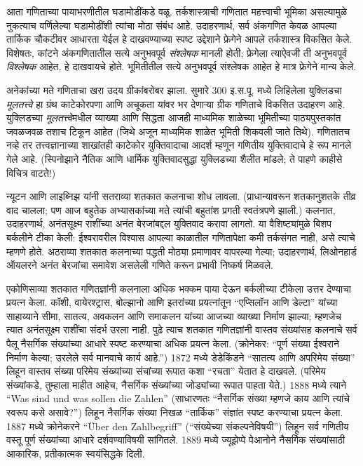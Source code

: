 \documentclass[../../../include/open-logic-section]{subfiles}
\begin{document}
आता गणिताच्या पायाभरणीतील घडामोडींकडे वळू. तर्कशास्त्राची गणितात महत्त्वाची
भूमिका असल्यामुळे नुकत्याच वर्णिलेल्या घडामोडींशी त्यांचा मोठा संबंध आहे.
उदाहरणार्थ, सर्व अंकगणित केवळ आपल्या तार्किक चौकटीवर आधारता येईल हे
दाखवण्याच्या स्पष्ट उद्देशाने फ्रेगेने आपले तर्कशास्त्र विकसित केले.
विशेषतः, कांटने अंकगणितातील सत्ये अनुभवपूर्व \emph{संश्लेषक} मानली होती;
फ्रेगेला त्याऐवजी ती अनुभवपूर्व \emph{विश्लेषक} आहेत, हे दाखवायचे होते.
भूमितीतील सत्ये अनुभवपूर्व संश्लेषक आहेत हे मात्र फ्रेगेने मान्य केले.

अनेकांच्या मते गणिताचा खरा उदय ग्रीकांबरोबर झाला. सुमारे 300 इ.स.पू.
मध्ये लिहिलेला युक्लिडचा \emph{मूलतत्त्वे} हा ग्रंथ काटेकोरपणा आणि
अचूकता यांवर भर देणाऱ्या ग्रीक गणिताचे विकसित उदाहरण आहे. युक्लिडच्या
\emph{मूलतत्त्वे}मधील व्याख्या आणि सिद्धता आजही माध्यमिक शाळेच्या
भूमितीच्या पाठ्यपुस्तकांत जवळजवळ तशाच टिकून आहेत (जिथे अजून माध्यमिक
शाळेत भूमिती शिकवली जाते तिथे). गणितातच नव्हे तर तत्त्वज्ञानाच्या
शाखांतही काटेकोर युक्तिवादाचा आदर्श म्हणून गणितीय युक्तिवादाचे हे रूप
मानले गेले आहे. (स्पिनोझाने नैतिक आणि धार्मिक युक्तिवादसुद्धा
युक्लिडच्या शैलीत मांडले; ते पाहणे काहीसे विचित्र वाटते!)

न्यूटन आणि लाइब्निझ यांनी सतराव्या शतकात कलनाचा शोध लावला. (प्राधान्यावरून
शतकानुशतके तीव्र वाद चालला; पण आज बहुतेक अभ्यासकांच्या मते त्यांची
बहुतांश प्रगती स्वतंत्रपणे झाली.) कलनात, उदाहरणार्थ, अनंतसूक्ष्म
राशींच्या अनंत बेरजांबद्दल युक्तिवाद करावा लागतो. या वैशिष्ट्यांमुळे
बिशप बर्कलीने टीका केली: ईश्वरावरील विश्वास आपल्या काळातील गणितापेक्षा
कमी तर्कसंगत नाही, असे त्याचे म्हणणे होते. अठराव्या शतकात कलनाच्या
पद्धती मोठ्या प्रमाणावर वापरल्या गेल्या; उदाहरणार्थ, लिओनहार्ड
ऑयलरने अनंत बेरजांचा समावेश असलेली गणिते करून प्रभावी निष्कर्ष मिळवले.

एकोणिसाव्या शतकात गणितज्ञांनी कलनाला अधिक भक्कम पाया देऊन बर्कलीच्या
टीकेला उत्तर देण्याचा प्रयत्न केला. कॉशी, वायेरश्ट्रास, बोल्झानो आणि
इतरांच्या प्रयत्नांतून ``एप्सिलॉन आणि डेल्टा'' यांच्या साहाय्याने सीमा,
सातत्य, अवकलन आणि समाकलन यांच्या आजच्या व्याख्या निर्माण झाल्या; म्हणजेच
त्यात अनंतसूक्ष्म राशींचा संदर्भ उरला नाही. पुढे त्याच शतकात गणितज्ञांनी
वास्तव संख्यांसह कलनाचे सर्व पैलू नैसर्गिक संख्यांच्या आधारे स्पष्ट
करण्याचा अधिक प्रयत्न केला. (क्रोनेकर: ``पूर्ण संख्या ईश्वराने निर्माण
केल्या; उरलेले सर्व मानवाचे कार्य आहे.'') 1872 मध्ये डेडेकिंडने
``सातत्य आणि अपरिमेय संख्या'' लिहून वास्तव संख्या परिमेय संख्यांच्या
संचांच्या रूपात कशा ``रचता'' येतात हे दाखवले. (परिमेय संख्यांकडे, तुम्हाला
माहीत आहेच, नैसर्गिक संख्यांच्या जोड्यांच्या रूपात पाहता येते.) 1888 मध्ये
त्याने ``Was sind und was sollen die Zahlen'' (साधारणतः ``नैसर्गिक
संख्या म्हणजे काय आणि त्यांचे स्वरूप कसे असावे?'') लिहून नैसर्गिक संख्या
निखळ ``तार्किक'' संज्ञांत स्पष्ट करण्याचा प्रयत्न केला. 1887 मध्ये
क्रोनेकरने ``\"Uber den Zahlbegriff'' (``संख्येच्या संकल्पनेविषयी'')
लिहून सर्व गणितीय वस्तू पूर्ण संख्यांच्या आधारे दर्शवण्याविषयी सांगितले.
1889 मध्ये ज्यूझेप्पे पेआनोने नैसर्गिक संख्यांसाठी आकारिक, प्रतीकात्मक
स्वयंसिद्धके दिली.
\end{document}
